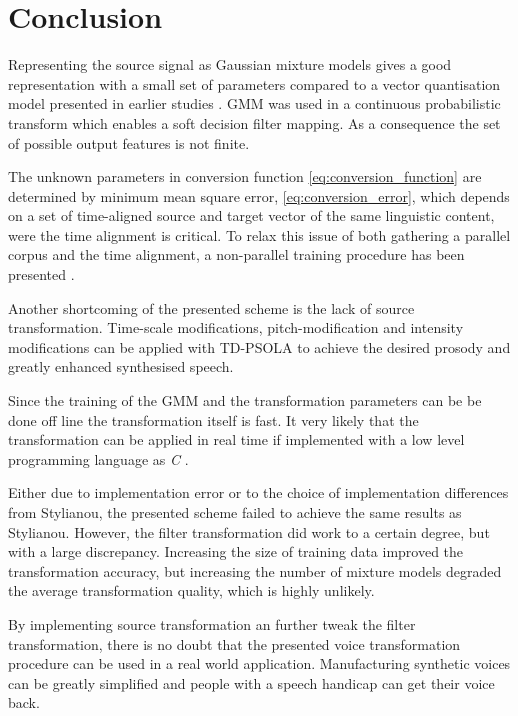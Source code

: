 \chapter{Conclusion} %
\label{cha:conclusion}
Representing the source signal as Gaussian mixture models gives a good representation with a small set of parameters compared to a vector quantisation model presented in earlier studies \cite{abe88}. GMM was used in a continuous probabilistic transform which enables a soft decision filter mapping. As a consequence the set of possible output features is not finite.


The unknown parameters in conversion function \eqref{eq:conversion_function} are determined by minimum mean square error, \eqref{eq:conversion_error}, which depends on a set of time-aligned source and target vector of the same linguistic content, were the time alignment is critical. To relax this issue of both gathering a parallel corpus and the time alignment, a non-parallel training procedure has been presented \cite{mouchtaris06,ye06}.

Another shortcoming of the presented scheme is the lack of source transformation. Time-scale modifications, pitch-modification and intensity modifications can be applied with \eg TD-PSOLA to achieve the desired prosody and greatly enhanced synthesised speech.

Since the training of the GMM and the transformation parameters can be be done off line the transformation itself is fast. It very likely that the transformation can be applied in real time if implemented with a low level programming language as \emph{C} \cite{kernighan88}. 

Either due to implementation error or to the choice of implementation differences from Stylianou, the presented scheme failed to achieve the same results as Stylianou. However, the filter transformation did work to a certain degree, but with a large discrepancy. Increasing the size of training data improved the transformation accuracy, but increasing the number of mixture models degraded the average transformation quality, which is highly unlikely.

By implementing source transformation an further tweak the filter transformation, there is no doubt that the presented voice transformation procedure can be used in a real world application. Manufacturing synthetic voices can be greatly simplified and people with a speech handicap can get their voice back.

